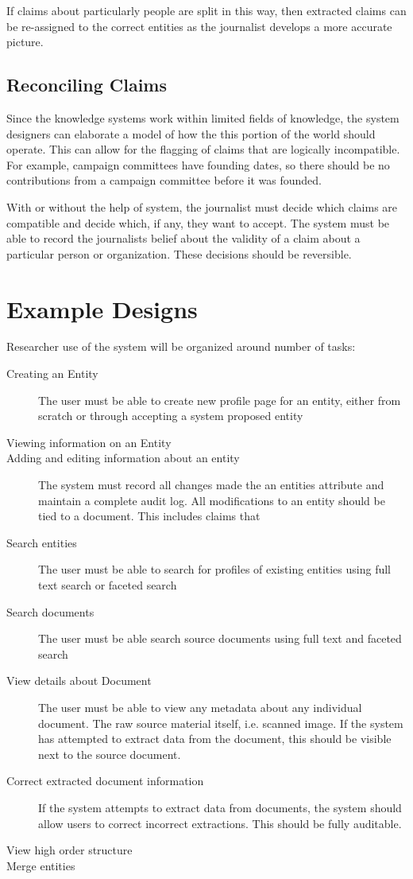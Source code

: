 \documentclass[format=siggraph, review=true]{acmart}
\begin{document}
If claims about particularly people are split in this way, then
extracted claims can be re-assigned to the correct entities as the
journalist develops a more accurate picture.


\subsection{Reconciling Claims}
Since the knowledge systems work within limited fields of knowledge,
the system designers can elaborate a model of how the this portion of
the world should operate. This can allow for the flagging of claims
that are logically incompatible. For example, campaign committees have
founding dates, so there should be no contributions from a campaign
committee before it was founded. 

With or without the help of system, the journalist must decide which
claims are compatible and decide which, if any, they want to
accept. The system must be able to record the journalists belief about
the validity of a claim about a particular person or
organization. These decisions should be reversible.

\section{Example Designs}
Researcher use of the system will be organized around number of tasks:

\begin{description}
\item[Creating an Entity] The user must be able to create new profile
  page for an entity, either from scratch or through accepting a
  system proposed entity
\item[Viewing information on an Entity]
\item[Adding and editing information about an entity] The system must
  record all changes made the an entities attribute and maintain a
  complete audit log. All modifications to an entity should be tied to
  a document. This includes claims that 
\item[Search entities] The user must be able to search for profiles of
  existing entities using full text search or faceted search
\item[Search documents] The user must be able search source documents
  using full text and faceted search
\item[View details about Document] The user must be able to view any
  metadata about any individual document. The raw source material
  itself, i.e. scanned image. If the system has attempted
  to extract data from the document, this should be visible next to
  the source document.
\item[Correct extracted document information] If the system attempts
  to extract data from documents, the system should allow users to
  correct incorrect extractions. This should be fully auditable.
\item[View high order structure]
\item[Merge entities]
\end{description}
\end{document}
